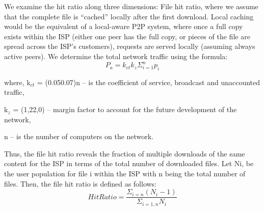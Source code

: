 \documentclass[12pt]{ilu}
\begin{document}
We examine the hit ratio along three dimensions: File hit ratio, where we assume that the complete file is “cached” locally after the first download. Local caching would be the equivalent of a local-aware P2P system, where once a full copy exists within the ISP (either one peer has the full copy, or pieces of the file are spread across the ISP’s customers), requests are served locally (assuming always active peers). We determine the total network traffic using the formula:
\begin{equation}
    P_{a} = k_{ct}k_{z}\Sigma_{i=1}^{n}p_{i}
    \label{eq2}
\end{equation}

where, k$_{ct}$ = (0.050.07)n – is the coefficient of service, broadcast and unaccounted traffic,

k$_z$  = (1,22,0) – margin factor to account for the future development of the network,

n – is the number of computers on the network.

Thus, the file hit ratio reveals the fraction of multiple downloads of the same content for the ISP in terms of the total number of downloaded files. Let Ni, be the user population for file i within the ISP with n being the total number of files. Then, the file hit ratio is defined as follows: 
\begin{equation}
    Hit Ratio = \frac{\Sigma_{i=n}(N_i - 1)}{\Sigma_{i=1,n}N_i}
    \label{eq3}
\end{equation}
\end{document}
